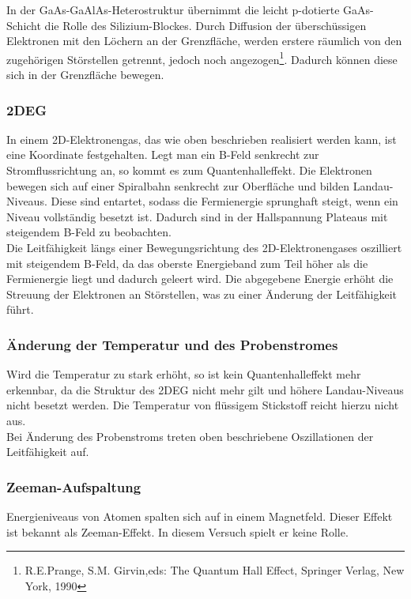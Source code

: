 In der GaAs-GaAlAs-Heterostruktur übernimmt die leicht p-dotierte GaAs-Schicht die Rolle des Silizium-Blockes. Durch Diffusion der überschüssigen Elektronen mit den Löchern an der Grenzfläche, werden erstere räumlich von den zugehörigen Störstellen getrennt, jedoch noch angezogen\footnote{R.E.Prange, S.M. Girvin,eds: The Quantum Hall Effect, Springer Verlag, New York, 1990}. Dadurch können diese sich in der Grenzfläche bewegen. 
\subsubsection{2DEG}
In einem 2D-Elektronengas, das wie oben beschrieben realisiert werden kann, ist eine Koordinate festgehalten. Legt man ein B-Feld senkrecht zur Stromflussrichtung an, so kommt es zum Quantenhalleffekt. Die Elektronen bewegen sich auf einer Spiralbahn senkrecht zur Oberfläche und bilden Landau-Niveaus. Diese sind entartet, sodass die Fermienergie sprunghaft steigt, wenn ein Niveau vollständig besetzt ist. Dadurch sind in der Hallspannung Plateaus mit steigendem B-Feld zu beobachten. \\
Die Leitfähigkeit längs einer Bewegungsrichtung des 2D-Elektronengases oszilliert mit steigendem B-Feld, da das oberste Energieband zum Teil höher als die Fermienergie liegt und dadurch geleert wird. Die abgegebene Energie erhöht die Streuung der Elektronen an Störstellen, was zu einer Änderung der Leitfähigkeit führt.
\subsubsection{Änderung der Temperatur und des Probenstromes}
Wird die Temperatur zu stark erhöht, so ist kein Quantenhalleffekt mehr erkennbar, da die Struktur des 2DEG nicht mehr gilt und höhere Landau-Niveaus nicht besetzt werden. Die Temperatur von flüssigem Stickstoff reicht hierzu nicht aus.\\
Bei Änderung des Probenstroms treten oben beschriebene Oszillationen der Leitfähigkeit auf.
\subsubsection{Zeeman-Aufspaltung}
Energieniveaus von Atomen spalten sich auf in einem Magnetfeld. Dieser Effekt ist bekannt als Zeeman-Effekt. In diesem Versuch spielt er keine Rolle. 
\newpage
